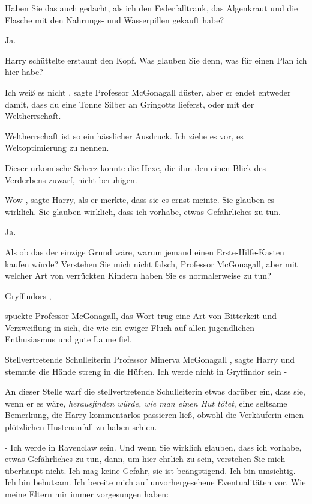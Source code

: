 \glqq Haben Sie das auch gedacht, als ich den Federfalltrank, das Algenkraut und
die Flasche mit den Nahrungs- und Wasserpillen gekauft habe?\grqq{}

\glqq Ja.\grqq{}

Harry schüttelte erstaunt den Kopf. \glqq Was glauben Sie denn, was für einen Plan
ich hier habe?\grqq{}

\glqq Ich weiß es nicht\grqq{} , sagte Professor McGonagall düster, \glqq aber
er endet entweder damit, dass du eine Tonne Silber an Gringotts lieferst,
oder mit der Weltherrschaft.\grqq{}

\glqq Weltherrschaft ist so ein hässlicher Ausdruck. Ich ziehe es vor, es
Weltoptimierung zu nennen.\grqq{}

Dieser urkomische Scherz konnte die Hexe, die ihm den einen Blick des Verderbens
zuwarf, nicht beruhigen.

\glqq Wow\grqq{} , sagte Harry, als er merkte, dass sie es ernst meinte. \glqq
Sie glauben es wirklich. Sie glauben wirklich, dass ich vorhabe, etwas
Gefährliches zu tun.\grqq{}

\glqq Ja.\grqq{}

\glqq Als ob das der einzige Grund wäre, warum jemand einen Erste-Hilfe-Kasten
kaufen würde? Verstehen Sie mich nicht falsch, Professor McGonagall, aber
mit welcher Art von verrückten Kindern haben Sie es normalerweise zu
tun?\grqq{}

\glqq Gryffindors\grqq{} ,

spuckte Professor McGonagall, das Wort trug eine Art von Bitterkeit und
Verzweiflung in sich, die wie ein ewiger Fluch auf allen jugendlichen
Enthusiasmus und gute Laune fiel.

\glqq Stellvertretende Schulleiterin Professor Minerva McGonagall\grqq{} , sagte
Harry und stemmte die Hände streng in die Hüften. \glqq Ich werde nicht in
Gryffindor sein -\grqq{}

An dieser Stelle warf die stellvertretende Schulleiterin etwas darüber ein, dass
sie, wenn er es wäre, \emph{herausfinden würde, wie man einen Hut tötet},
eine seltsame Bemerkung, die Harry kommentarlos passieren ließ, obwohl die
Verkäuferin einen plötzlichen Hustenanfall zu haben schien.

\glqq - Ich werde in Ravenclaw sein. Und wenn Sie wirklich glauben, dass ich
vorhabe, etwas Gefährliches zu tun, dann, um hier ehrlich zu sein, verstehen
Sie mich überhaupt nicht. Ich mag keine Gefahr, sie ist beängstigend. Ich
bin umsichtig. Ich bin behutsam. Ich bereite mich auf unvorhergesehene
Eventualitäten vor. Wie meine Eltern mir immer vorgesungen haben:

